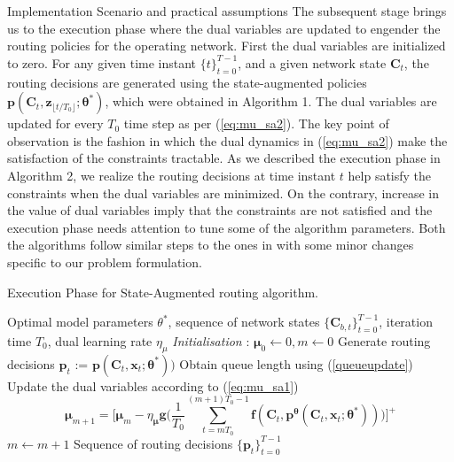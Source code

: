 \documentclass[lettersize,journal]{IEEEtran}
\begin{document}
\begin{subsection}{Implementation Scenario and practical assumptions}
The subsequent stage brings us to the execution phase where the dual variables are updated to engender the routing policies for the operating network. First the dual variables are initialized to zero. For any given time instant $\{t\}_{t=0}^{T-1}$, and a given network state $\bm{C}_t$, the routing decisions are generated using the state-augmented policies $\mathbf{p}(\bm{C}_t,\mathbf{z}_{\lfloor t/T_0 \rfloor};\bm{\theta}^*)$, which were obtained in Algorithm 1. The dual variables are updated for every $T_0$ time step as per (\ref{eq:mu_sa2}). The key point of observation is the fashion in which the dual dynamics in (\ref{eq:mu_sa2}) make the satisfaction of the constraints tractable. As we described the execution phase in Algorithm 2, we realize the routing decisions at time instant $t$ help satisfy the constraints when the dual variables are minimized. On the contrary, increase in the value of dual variables imply that the constraints are not satisfied and the execution phase needs attention to tune some of the algorithm parameters. Both the algorithms follow similar steps to the ones in \cite{naderializadeh2022state} with some minor changes specific to our problem formulation.

\begin{algorithm*}%
\caption{Execution Phase for State-Augmented routing algorithm.}
\label{alg:alg2}
\begin{algorithmic}[1]
 \renewcommand{\algorithmicrequire}{\textbf{Input:}}
 \REQUIRE Optimal model parameters $\theta^*$, sequence of network states $\{\mathbf{C}_{b,t} \}_{t=0}^{T-1}$, iteration time $T_0$, dual learning rate $\eta_\mu$
\STATE \textit{Initialisation} : $\bm{\mu}_0 \leftarrow 0, m \leftarrow 0$
\STATE Generate routing decisions $\mathbf{p}_t$ := $\mathbf{p}(\mathbf{C}_t,\mathbf{x}_t;\bm{\theta}^*))$
\STATE Obtain queue length using (\ref{queueupdate})
\STATE Update the dual variables according to (\ref{eq:mu_sa1})
\begin{equation*} 
    \bm{\mu}_{m+1} = \Bigg[ \bm{\mu}_m 
    - \eta_{\bm{\mu}} \mathbf{g}\Biggl(\frac{1}{T_0} \sum_{t=mT_0}^{(m+1)T_0-1} \mathbf{f}(\mathbf{C}_t, \mathbf{p}^{\bm{\theta}}(\mathbf{C}_t,\mathbf{x}_t;\bm{\theta}^*)) \Biggl) \Bigg]^+
\end{equation*}
$m \leftarrow m+1$
\ENDIF
\ENDFOR
\renewcommand{\algorithmicrequire}{\textbf{Output:}}
 \REQUIRE Sequence of routing decisions $\{\mathbf{p}_t\}_{t=0}^{T-1}$
\end{algorithmic}
\end{algorithm*}
\end{subsection}
\end{document}
